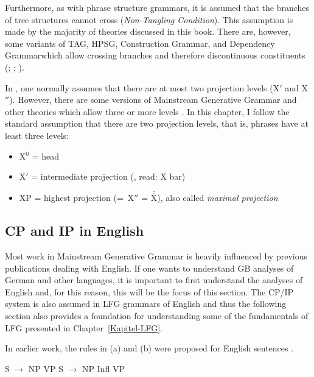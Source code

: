 Furthermore, as with phrase structure grammars, it is assumed that the branches of tree structures
cannot cross (\emph{Non-Tangling Condition}). This assumption is made by
the majority of theories discussed in this book. There are, however, some variants of TAG\indextag,
HPSG\indexhpsg, Construction Grammar\indexcxg, and Dependency Grammar\indexdg which allow crossing branches and therefore
discontinuous constituents
(\citealp*{BJR91a,Reape94a,BC2005a}; \citealp[]{Heringer96a-u}; \citealp[Section~9.6.2]{Eroms2000a}).

In \xbart, one normally assumes that there are at most two projection levels (X$'$ and X$''$). However, there are some versions of Mainstream
Generative Grammar and other theories which allow three or more levels \citep{Jackendoff77,Uszkoreit87a}. In this chapter, I follow the
standard assumption that there are two projection levels, that is, phrases have at least three levels:

\begin{itemize}
\item X$^0$ = head
\item X$'$ = intermediate projection (\xbar, read: X bar) 
\item XP = highest projection (=~X$''$ = $\overline{\overline{\mbox{X}}}$), also called \emph{maximal projection} 
\end{itemize}

\subsection{CP and IP in English}
\label{Abschnitt-GB-CP-IP-System-Englisch}\label{sec-GB-CP-IP-System-English}

Most work in Mainstream Generative Grammar is heavily influenced by previous publications dealing with English. If one wants to understand GB analyses of
German and other languages, it is important to first understand the analyses of English and, for this reason, this will be the focus of this section.
The CP/IP system is also assumed in LFG grammars of English and thus the following section also provides a foundation for understanding some of the
fundamentals of LFG presented in Chapter~\ref{Kapitel-LFG}.

In earlier work, the rules in (a) and (b) were proposed for English sentences \citep[]{Chomsky81a}.

\eal
\ex S $\to$ NP VP
\ex S $\to$ NP Infl VP
\zl

